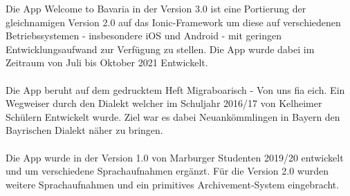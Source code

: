 
Die App \glqq Welcome to Bavaria\grqq{} in der Version 3.0 ist eine Portierung der gleichnamigen Version 2.0 auf das Ionic-Framework um diese auf verschiedenen Betriebssystemen - insbesondere iOS und Android - mit geringen Entwicklungsaufwand zur Verfügung zu stellen. Die App wurde dabei im Zeitraum von Juli bis Oktober 2021 Entwickelt.\\\\
Die App beruht auf dem gedrucktem Heft \glqq Migraboarisch - Von uns fia eich. Ein Wegweiser durch den Dialekt\grqq{} welcher im Schuljahr 2016/17 von Kelheimer Schülern Entwickelt wurde. Ziel war es dabei Neuankömmlingen in Bayern den Bayrischen Dialekt näher zu bringen.\\\\
Die App wurde in der Version 1.0 von Marburger Studenten 2019/20 entwickelt und um verschiedene Sprachaufnahmen ergänzt. Für die Version 2.0 wurden weitere Sprachaufnahmen und ein primitives Archivement-System eingebracht.

